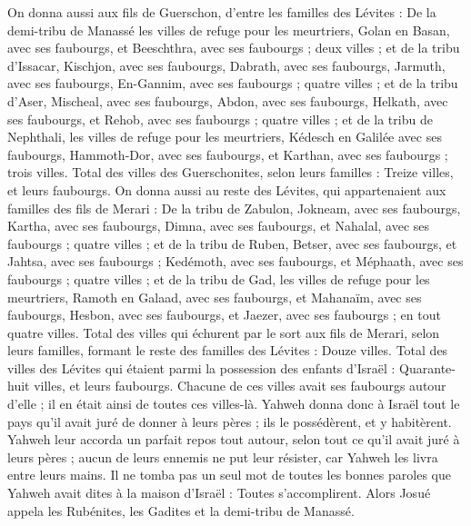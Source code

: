 \begin{multicols}{2}
On donna aussi aux fils de Guerschon, d'entre les familles des Lévites : De la demi-tribu de Manassé les villes de refuge pour les meurtriers, Golan en Basan, avec ses faubourgs, et Beeschthra, avec ses faubourgs ; deux villes ;
et de la tribu d'Issacar, Kischjon, avec ses faubourgs, Dabrath, avec ses faubourgs,
Jarmuth, avec ses faubourgs, En-Gannim, avec ses faubourgs ; quatre villes ;
et de la tribu d'Aser, Mischeal, avec ses faubourgs, Abdon, avec ses faubourgs,
Helkath, avec ses faubourgs, et Rehob, avec ses faubourgs ; quatre villes ;
et de la tribu de Nephthali, les villes de refuge pour les meurtriers, Kédesch en Galilée avec ses faubourgs, Hammoth-Dor, avec ses faubourgs, et Karthan, avec ses faubourgs ; trois villes.
Total des villes des Guerschonites, selon leurs familles : Treize villes, et leurs faubourgs.
On donna aussi au reste des Lévites, qui appartenaient aux familles des fils de Merari : De la tribu de Zabulon, Jokneam, avec ses faubourgs, Kartha, avec ses faubourgs,
Dimna, avec ses faubourgs, et Nahalal, avec ses faubourgs ; quatre villes ;
et de la tribu de Ruben, Betser, avec ses faubourgs, et Jahtsa, avec ses faubourgs ;
Kedémoth, avec ses faubourgs, et Méphaath, avec ses faubourgs ; quatre villes ;
et de la tribu de Gad, les villes de refuge pour les meurtriers, Ramoth en Galaad, avec ses faubourgs, et Mahanaïm, avec ses faubourgs,
Hesbon, avec ses faubourgs, et Jaezer, avec ses faubourgs ; en tout quatre villes.
Total des villes qui échurent par le sort aux fils de Merari, selon leurs familles, formant le reste des familles des Lévites : Douze villes.
Total des villes des Lévites qui étaient parmi la possession des enfants d'Israël : Quarante-huit villes, et leurs faubourgs.
Chacune de ces villes avait ses faubourgs autour d'elle ; il en était ainsi de toutes ces villes-là.
Yahweh donna donc à Israël tout le pays qu'il avait juré de donner à leurs pères ; ils le possédèrent, et y habitèrent.
Yahweh leur accorda un parfait repos tout autour, selon tout ce qu'il avait juré à leurs pères ; aucun de leurs ennemis ne put leur résister, car Yahweh les livra entre leurs mains.
Il ne tomba pas un seul mot de toutes les bonnes paroles que Yahweh avait dites à la maison d'Israël : Toutes s'accomplirent.
\VerseOne{}Alors Josué appela les Rubénites, les Gadites et la demi-tribu de Manassé.

\end{multicols}
